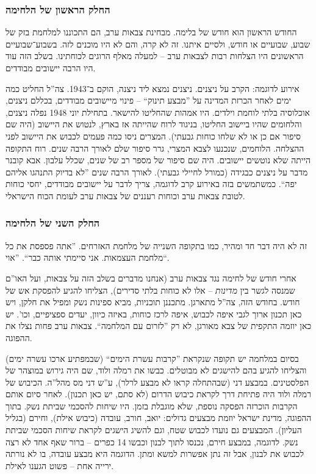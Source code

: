 \documentclass[]{../../../../tex/classes/styledArticle}
\begin{document}
	\subsubsection*{החלק הראשון של הלחימה}
	החודש הראשון הוא חודש של בלימה. מבחינת צבאות ערב, הם התכוננו למלחמת בזק של שבוע, שבועיים או חודש, ולסיים איתנו. זה לא קרה, והם לא היו מוכנים לזה. בשבוע־שבועיים הראשונים היו הצלחות רבות לצבאות ערב – למעלה מאלף הרוגים לכוחתינו. בשלב הזה עוד היו הרבה יישובים מבודדים. 
	
	אירוע לדוגמה: הקרב על ניצנים. ניצנים נמצא ליד ניצנה, הוקם ב־1943. צה''ל החליט כמה ימים לאחר הכרזת המדינה על ''מבצע תינוק`` – פינוי מיישובים מבודדים, בכללם ניצנים, אוכלוסיה בלתי לוחמת וילדים. היו אמהות שהחליטו להישאר. בתחילת יוני 1948 נפלה ניצנים, והלחומים שהיו ביישוב החליטו, בניגוד לרוח שהייתה אז בארץ, לנטוש את היישוב (היה שם סיפור אם כן או לא שלחו כוחות גבעתי). המצרים ניסו כמה פעמים לכבוש את היישוב לפני ההצלחה. הלוחמים, שנכנעו לצבא המצרי, גרר סיפור שלם לאורך הרבה שנים. רוח התקופה הייתה שלא נוטשים יישובים. היה שם סיפור של מספר רב של שנים, שכלל עלבון. אבא קובנר מדבר על ניצנים כבגידה (כמורל לחיילי גבעתי). לאורך הרבה שנים ''לא בדיוק התנהגו אליהם יפה``. כמשתמשים בזה באירוע קרב לדוגמה, צריך לדבר על יישובים מבודדים, יחסי כוחות לטובת צבאות ערב וכוחות רעננים של צבאות ערב לעומת הכוח הישראלי. 
	
	\subsubsection*{החלק השני של הלחימה}
	זה לא היה דבר חד ומהיר, כמו בתקופה השנייה של מלחמת האזרחים. ''אתה פספסת את כל מלחמת העצמאות. אני סיימתי אותה כבר``. ''אוי``. 
	
	אחרי חודש של לחימה נגד צבאות ערב (אנחנו מדברים בשלב הזה על צבאות, ועל האו''ם שמנסה לגשר בין \textit{מדינות} – אלו לא כוחות בלתי סדירים), הצליחו להגיע להפסקת אש של חודש. בחודש הזה, צה''ל מתארגן. מתכננן תוכניות, מביא ספינות נשק ומפיל את חלקן, ויש כאן תכנון ארוך לגבי איפה לכבוש, איפה לרכז כוחות, באיזה כיוון, יעדים ספציפיים, וכו'. יש כאן יוזמה התקפית של צבא מאורגן, לא רק ''לזרום עם המלחמה``. צבאות ערב פחות נצלו את ההפוגה. 
	
	בסיום במלחמה יש תקופה שנקראת ''קרבות עשרת הימים`` (שבמפתיע ארכו עשרה ימים) והצליחו להגיע בהם להישגים לא מבוטלים. כבשו את רמלה ולוד, שם היה גירוש במוצהר של הפלסטינים. במבצע דני (שבהתחלה קראו לא מבצע לרלר), ע''ש דני מס מהל''ה. הכיבוש של רמלה ולוד היה פתיחת דרך לקראת כיבוש הדרום (לא סתם, יש כאן תכנון). לאחר סיום אותם הקרבות הוכרזה הפסקה נוספת, שלא מוגבלת בזמן. היו שיחות להסכמי שביתת נשק. בתוך ההפוגה, מדינת ישראל יוזמת מבצעים גדולים: יואב, חורב, עובדה (כיבוש אילת), וחירם (בגליל העליון). המבצעים גם נועדו לכבוש שטח, וגם להשיג הישגים לקראת שיחות הסכמי שביתת נשק. לדוגמה, במבצע חירם, נכנסו לתוך לבנון וכבשו 14 כפרים – ברור שאף אחד לא רצה לכבוש את לבנון, אבל זה נתן אפשרות למשא ומתן. הדוגמה היא מבצע עובדה, בו לא נורתה ירייה אחת – פשוט הגענו לאילת. 
	
\end{document}
